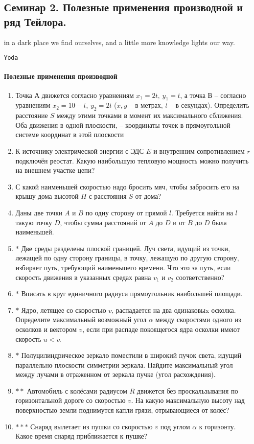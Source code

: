 \subsection*{Семинар 2. Полезные применения производной и ряд Тейлора.}
\epigraph{\textsf{in a dark place we find ourselves, and a little more knowledge lights our way.}}{\texttt{Yoda}}
\paragraph{Полезные применения производной}
\begin{enumerate}
    \item Точка А движется согласно уравнениям $x_1 = 2t,\ y_1 = t$, а точка В – согласно уравнениям $x_2 = 10-t,\ y_2 = 2t$ ($x, y$ – в метрах, $t$ – в секундах). Определить расстояние $S$ между этими точками в момент их максимального сближения. Оба движения в одной плоскости,  – координаты точек в прямоугольной системе координат в этой плоскости
    \item К источнику электрической энергии с ЭДС $E$ и внутренним сопротивлением $r$ подключён реостат. Какую наибольшую тепловую мощность можно получить на внешнем участке цепи?
    \item С какой наименьшей скоростью надо бросить мяч, чтобы забросить его на крышу дома высотой $H$ с расстояния $S$ от дома?
    \item Даны две точки $A$ и $B$ по одну сторону от прямой $l$. Требуется найти на $l$ такую точку $D$, чтобы сумма расстояний от $A$ до $D$ и от $B$ до $D$ была наименьшей.
    \item $\boldsymbol{*}$ Две среды разделены плоской границей. Луч света, идущий из точки, лежащей по одну сторону границы, в точку, лежащую по другую сторону, избирает путь, требующий наименьшего времени. Что это за путь, если скорость движения в указанных средах равна $v_1$ и $v_2$ соответственно?
    \item $\boldsymbol{*}$ Вписать в круг единичного радиуса прямоугольник наибольшей площади.
    \item $\boldsymbol{*}$ Ядро, летящее со скоростью $v$, распадается на два одинаковыx осколка. Определите максимальный возможный угол $\alpha$ между скоростями одного из осколков и вектором $v$, если при распаде покоящегося ядра осколки имеют скорость $u<v$.
    \item $\boldsymbol{*}$ Полуцилиндрическое зеркало поместили в широкий пучок света, идущий параллельно плоскости симметрии зеркала. Найдите максимальный угол между лучами в отраженном от зеркала пучке (угол расхождения).
    \item $\boldsymbol{**}$ Автомобиль с колёсами радиусом $R$ движется без проскальзывания по горизонтальной дороге со скоростью $v$. На какую максимальную высоту над поверхностью земли поднимутся капли грязи, отрывающиеся от колёс?
    \item $\boldsymbol{***}$ Снаряд вылетает из пушки со скоростью $v$ под углом $\alpha$ к горизонту. Какое время снаряд приближается к пушке?
\end{enumerate}

